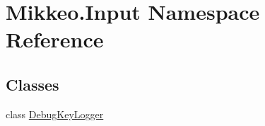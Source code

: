 \hypertarget{namespace_mikkeo_1_1_input}{}\section{Mikkeo.\+Input Namespace Reference}
\label{namespace_mikkeo_1_1_input}
\subsection*{Classes}
\begin{DoxyCompactItemize}
\item 
class \hyperlink{class_mikkeo_1_1_input_1_1_debug_key_logger}{Debug\+Key\+Logger}
\end{DoxyCompactItemize}
